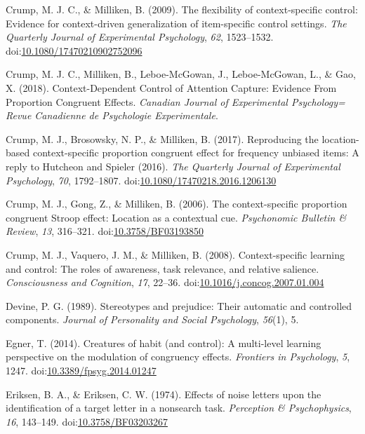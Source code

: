\documentclass[english,,man,floatsintext]{apa6}
\begin{document}
\hypertarget{ref-crump_flexibility_2009}{}
Crump, M. J. C., \& Milliken, B. (2009). The flexibility of
context-specific control: Evidence for context-driven generalization of
item-specific control settings. \emph{The Quarterly Journal of
Experimental Psychology}, \emph{62}, 1523--1532.
doi:\href{https://doi.org/10.1080/17470210902752096}{10.1080/17470210902752096}

\hypertarget{ref-crump_context-dependent_2018}{}
Crump, M. J. C., Milliken, B., Leboe-McGowan, J., Leboe-McGowan, L., \&
Gao, X. (2018). Context-Dependent Control of Attention Capture: Evidence
From Proportion Congruent Effects. \emph{Canadian Journal of
Experimental Psychology= Revue Canadienne de Psychologie Experimentale}.

\hypertarget{ref-crump_reproducing_2017}{}
Crump, M. J., Brosowsky, N. P., \& Milliken, B. (2017). Reproducing the
location-based context-specific proportion congruent effect for
frequency unbiased items: A reply to Hutcheon and Spieler (2016).
\emph{The Quarterly Journal of Experimental Psychology}, \emph{70},
1792--1807.
doi:\href{https://doi.org/10.1080/17470218.2016.1206130}{10.1080/17470218.2016.1206130}

\hypertarget{ref-crump_context-specific_2006}{}
Crump, M. J., Gong, Z., \& Milliken, B. (2006). The context-specific
proportion congruent Stroop effect: Location as a contextual cue.
\emph{Psychonomic Bulletin \& Review}, \emph{13}, 316--321.
doi:\href{https://doi.org/10.3758/BF03193850}{10.3758/BF03193850}

\hypertarget{ref-crump_context-specific_2008}{}
Crump, M. J., Vaquero, J. M., \& Milliken, B. (2008). Context-specific
learning and control: The roles of awareness, task relevance, and
relative salience. \emph{Consciousness and Cognition}, \emph{17},
22--36.
doi:\href{https://doi.org/10.1016/j.concog.2007.01.004}{10.1016/j.concog.2007.01.004}

\hypertarget{ref-devine_stereotypes_1989}{}
Devine, P. G. (1989). Stereotypes and prejudice: Their automatic and
controlled components. \emph{Journal of Personality and Social
Psychology}, \emph{56}(1), 5.

\hypertarget{ref-egner_creatures_2014}{}
Egner, T. (2014). Creatures of habit (and control): A multi-level
learning perspective on the modulation of congruency effects.
\emph{Frontiers in Psychology}, \emph{5}, 1247.
doi:\href{https://doi.org/10.3389/fpsyg.2014.01247}{10.3389/fpsyg.2014.01247}

\hypertarget{ref-eriksen_effects_1974}{}
Eriksen, B. A., \& Eriksen, C. W. (1974). Effects of noise letters upon
the identification of a target letter in a nonsearch task.
\emph{Perception \& Psychophysics}, \emph{16}, 143--149.
doi:\href{https://doi.org/10.3758/BF03203267}{10.3758/BF03203267}
\end{document}
